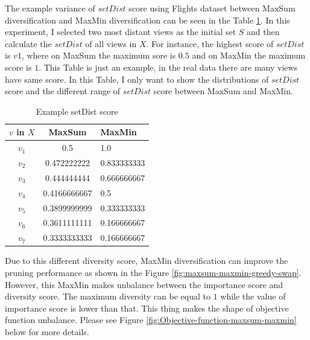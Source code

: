 \documentclass{article}
\begin{document}
The example variance of $ setDist $ score using Flights dataset between MaxSum diversification and MaxMin diversification can be seen in the Table \ref{tab:setDist-score}. In this experiment, I selected two most distant views as the initial set $ S $ and then calculate the $ setDist $ of all views in $ X $. For instance, the highest score of $ setDist $ is $ v1 $, where on MaxSum the maximum sore is $ 0.5 $ and on MaxMin the maximum score is $ 1 $. This Table is just an example, in the real data there are many views have same score. In this Table, I only want to show the distributions of $ setDist $ score and the different range of $ setDist $ score between MaxSum and MaxMin. 

\begin{table}
	\begin{center}
		\caption{Example setDist score}
		\label{tab:setDist-score}
		\begin{tabular}{ccl}
			\toprule
			$ v $ in $ X $ &MaxSum &MaxMin\\
			\midrule
			$ v_1 $ & 0.5 & 1.0\\
			$ v_2 $ & 0.472222222 & 0.833333333\\
			$ v_3 $ & 0.444444444 & 0.666666667\\
			$ v_4 $ & 0.4166666667 & 0.5\\
			$ v_5 $ & 0.3899999999 & 0.333333333\\
			$ v_6 $ & 0.3611111111 & 0.166666667\\
			$ v_7 $ & 0.3333333333 & 0.166666667\\
			\bottomrule
		\end{tabular}
	\end{center}
\end{table}


Due to this different diversity score, MaxMin diversification can improve the pruning performance as shown in the Figure \ref{fig:maxsum-maxmin-greedy-swap}. However, this MaxMin makes unbalance between the importance score and diversity score. The maximum diversity can be equal to $ 1 $ while the value of importance score is lower than that. This thing makes the shape of objective function unbalance. Please see Figure \ref{fig:Objective-function-maxsum-maxmin} below for more details.
\end{document}

